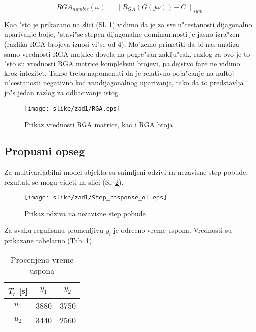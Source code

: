 \documentclass[a4paper,11pt]{article}
\theoremstyle{definition} \newtheorem{deff}{Definicija}[section]
\theoremstyle{definition} \newtheorem{prim}[deff]{Primer}
\theoremstyle{plain} \newtheorem{teor}[deff]{Teorema}
\begin{document}
	\begin{equation}
		RGA_{number}(\omega) = \left\| R_{GA}(G(j\omega)) - C \right\|_{sum}
	\end{equation}
	
	Kao "sto je prikazano na slici (Sl. \ref{fig:RGA}) vidimo da je za sve u"cestanosti dijagonalno uparivanje bolje, "stavi"se stepen dijagonalne dominantnosti je jasno izra"zen (razlika RGA brojeva iznosi vi"se od 4). Mo"zemo primetiti da bi nas analiza samo vrednosti RGA matrice dovela na pogre"san zaklju"cak, razlog za ovo je to "sto su vrednosti RGA matrice kompleksni brojevi, pa dejstvo faze ne vidimo kroz intezitet. Tako\dj{}e treba napomenuti da je relativno poja"canje na nultoj u"cestanosti negativno kod vandijagonalnog uparivanja, tako da to predstavlja jo"s jedan razlog za odbacivanje istog.
	
	\begin{figure}[!h]
		\centering
		\texttt{[image: slike/zad1/RGA.eps]}
		\caption{Prikaz vrednosti RGA matrice, kao i RGA broja}
		\label{fig:RGA}
	\end{figure}
	
	
	\newpage
	\subsection{Propusni opseg}
	
	Za multivarijabilni model objekta su snimljeni odzivi na nezavisne step pobude, rezultati se mogu videti na slici (Sl. \ref{fig:ol_step}).
	\vspace{1cm}
	
	\begin{figure}[!h]
		\centering
		\texttt{[image: slike/zad1/Step\_response\_ol.eps]}
		\caption{Prikaz odziva na nezavisne step pobude}
		\label{fig:ol_step}
	\end{figure}
	\vspace{1cm}
	
	Za svaku regulisanu promenljivu $y_i$ je odre\dj{}eno vreme uspona. Vrednosti su prikazane tabelarno (Tab. \ref{tab:uspon}).
	
	\begin{table}[h]
		\centering
		\begin{tabular}{|c|c|c|}
			\hline
			$T_r$ [s] & $y_1$  & $y_2$ \\ \hline
			$u_1$ & 3880   & 3750  \\ \hline
			$u_2$ & 3440   & 2560  \\ \hline
		\end{tabular}
		\caption{Procenjeno vreme uspona}
		\label{tab:uspon}
	\end{table}
	
\end{document}
